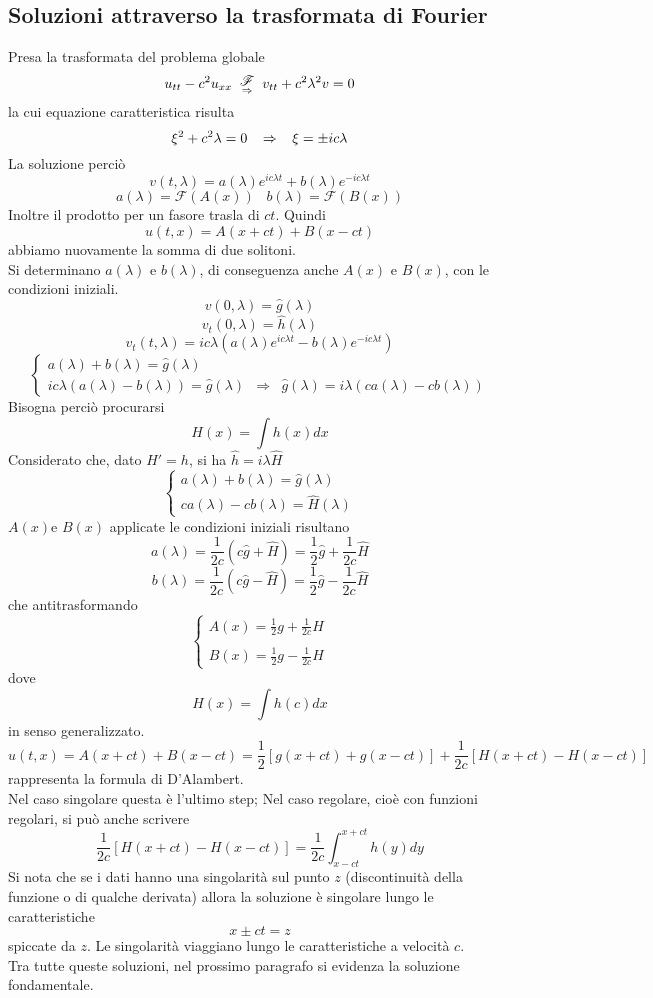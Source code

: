 \subsection{Soluzioni attraverso la trasformata di Fourier}
Presa la trasformata del problema globale
\[
	u_{tt} - c^2u_{xx}
	\substack{\displaystyle{\mathscr{F}} \\ \;\;\; \Rightarrow \;\;\;}
	v_{tt} + c^2 \lambda^2 v = 0
\]
la cui equazione caratteristica risulta
\[
	\xi^2 +c^2 \lambda=0 \;\;\; \Rightarrow \;\;\; \xi=\pm ic \lambda
\]
La soluzione perci\`o
\[
	v(t,\lambda)= a(\lambda)e^{ic\lambda t} + b(\lambda)e^{-ic\lambda t}
\]
\[
	a(\lambda)= {\mathscr{F} \left( A(x) \right)} \;\;\;
	b(\lambda)= {\mathscr{F} \left( B(x) \right)}
\]
Inoltre il prodotto per un fasore trasla di $ct$.
Quindi
\[
	u(t,x)= A(x+ct) + B(x-ct)
\]
abbiamo nuovamente la somma di due solitoni.\\
Si determinano $a(\lambda)$ e $b(\lambda)$, di conseguenza anche $A(x)$ e
$B(x)$, con le condizioni iniziali.
\[
	v(0,\lambda)=\hat{g}(\lambda)
\]
\[
	v_t(0,\lambda)=\hat{h}(\lambda)
\]
\[
	v_t(t,\lambda)= ic\lambda \left(
	a(\lambda)e^{ic\lambda t} - b(\lambda)e^{-ic\lambda t} \right)
\]
\[
	\left\{
	\begin{array}{lcl}
		a(\lambda)+b(\lambda)=\hat{g}(\lambda) \\
		ic\lambda (a(\lambda)-b(\lambda))= \hat{g}(\lambda)
		&\Rightarrow&
		\hat{g}(\lambda) = i\lambda (ca(\lambda) - cb(\lambda))
	\end{array}
	\right.
\]
Bisogna perci\`o procurarsi
\[
	H(x)= \int h(x)dx
\]
Considerato che, dato $H'=h$, si ha $\hat{h}=i\lambda \hat{H}$
\[
	\left\{
	\begin{array}{l}
		a(\lambda)+b(\lambda)=\hat{g}(\lambda) \\
		ca(\lambda)-cb(\lambda)= \hat{H}(\lambda)
	\end{array}
	\right.
\]
$A(x)$e $B(x)$ applicate le condizioni iniziali risultano
\[
	a(\lambda)=\frac{1}{2c}(c\hat{g}+ \hat{H})
	= \frac{1}{2}\hat{g}+ \frac{1}{2c}\hat{H}
\]
\[
	b(\lambda)=\frac{1}{2c}(c\hat{g}- \hat{H})
	= \frac{1}{2}\hat{g}- \frac{1}{2c}\hat{H}
\]
che antitrasformando
\[
	\left\{
	\begin{array}{l}
		\displaystyle{ A(x)=\frac{1}{2}g + \frac{1}{2c}H }\\\\
		\displaystyle{ B(x)=\frac{1}{2}g - \frac{1}{2c}H }
	\end{array}
	\right.
\]
dove
\[
	H(x)= \int h(c) dx
\]
in senso generalizzato.
\[
	u(t,x)= A(x +ct) + B(x-ct)=
	\frac{1}{2}[g(x+ct)+ g(x-ct)]+
	\frac{1}{2c}[H(x+ct)-H(x-ct)]
\]
rappresenta la formula di D'Alambert.\\
Nel caso singolare questa \`e l'ultimo step; Nel caso regolare, cio\`e con
funzioni regolari, si pu\`o anche scrivere
\[
	\frac{1}{2c}[H(x+ct)-H(x-ct)]=
	\frac{1}{2c}\int_{x-ct}^{x+ct} h(y)dy
\]
Si nota che se i dati hanno una singolarit\`a sul punto $z$ (discontinuit\`a
della funzione o di qualche derivata) allora la soluzione \`e singolare lungo
le caratteristiche
\[
	x \pm ct=z
\]
spiccate da $z$. Le singolarit\`a viaggiano lungo le caratteristiche a
velocit\`a $c$.\\
Tra tutte queste soluzioni, nel prossimo paragrafo si evidenza la soluzione
fondamentale.
